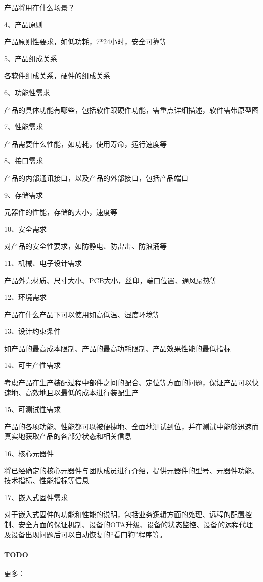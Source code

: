 \documentclass[letterpaper,11pt,english]{sphinxmanual}
\begin{document}
产品将用在什么场景？

4、产品原则

产品原则性要求，如低功耗，7*24小时，安全可靠等

5、产品组成关系

各软件组成关系，硬件的组成关系

6、功能性需求

产品的具体功能有哪些，包括软件跟硬件功能，需重点详细描述，软件需带原型图

7、性能需求

产品需要什么性能，如功耗，使用寿命，运行速度等

8、接口需求

产品的内部通讯接口，以及产品的外部接口，包括产品端口

9、存储需求

元器件的性能，存储的大小，速度等

10、安全需求

对产品的安全性要求，如防静电、防雷击、防浪涌等

11、机械、电子设计需求

产品外壳材质、尺寸大小、PCB大小，丝印，端口位置、通风扇热等

12、环境需求

产品在什么产品下可以使用如高低温、湿度环境等

13、设计约束条件

如产品的最高成本限制、产品的最高功耗限制、产品效果性能的最低指标

14、可生产性需求

考虑产品在生产装配过程中部件之间的配合、定位等方面的问题，保证产品可以快速地、高效地且以最低的成本进行装配生产

15、可测试性需求

产品的各项功能、性能都可以被便捷地、全面地测试到位，并在测试中能够迅速而真实地获取产品的各部分状态和相关信息

16、核心元器件

将已经确定的核心元器件与团队成员进行介绍，提供元器件的型号、元器件功能、技术指标、性能指标等信息

17、嵌入式固件需求

对于嵌入式固件的功能和性能的说明，包括业务逻辑方面的处理、远程的配置控制、安全方面的保证机制、设备的OTA升级、设备的状态监控、设备的远程代理及设备出现问题后可以自动恢复的“看门狗”程序等。


\paragraph{TODO}
\label{\detokenize{chapter_project/AI_hardware:todo}}
更多：
\end{document}
